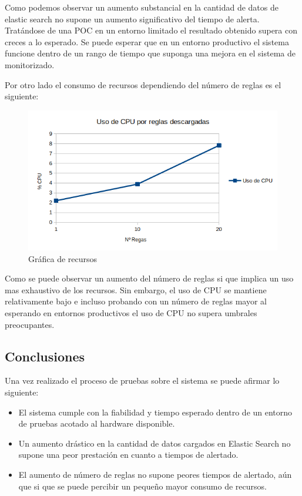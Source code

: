 Como podemos observar un aumento substancial en la cantidad de datos de elastic search no supone un aumento significativo del tiempo de alerta. Tratándose de una POC en un entorno limitado el resultado obtenido supera con creces a lo esperado. Se puede esperar que en un entorno productivo el sistema funcione dentro de un rango de tiempo que suponga una mejora en el sistema de monitorizado. 

Por otro lado el consumo de recursos dependiendo del número de reglas es el siguiente:

\begin{figure}[H]
\centerline{\includegraphics[width=15cm]{figuras/GraficaRecursos.png}}
\caption{Gráfica de recursos}
\label{enlace1}
\end{figure}

Como se puede observar un aumento del número de reglas si que implica un uso mas exhaustivo de los recursos. Sin embargo, el uso de CPU se mantiene relativamente bajo e incluso probando con un número de reglas mayor al esperando en entornos productivos el uso de CPU no supera umbrales preocupantes.


\subsection{Conclusiones}

Una vez realizado el proceso de pruebas sobre el sistema se puede afirmar lo siguiente:

\begin{itemize}

\item El sistema cumple con la fiabilidad y tiempo esperado dentro de un entorno de pruebas acotado al hardware disponible.

\item Un aumento drástico en la cantidad de datos cargados en Elastic Search no supone una peor prestación en cuanto a tiempos de alertado.

\item El aumento de número de reglas no supone peores tiempos de alertado, aún que si que se puede percibir un pequeño mayor consumo de recursos. 

\end{itemize}


